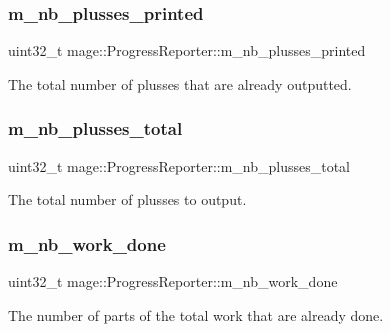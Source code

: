 \subsubsection{\texorpdfstring{m\+\_\+nb\+\_\+plusses\+\_\+printed}{m\_nb\_plusses\_printed}}
{\footnotesize\ttfamily uint32\+\_\+t mage\+::\+Progress\+Reporter\+::m\+\_\+nb\+\_\+plusses\+\_\+printed\hspace{0.3cm}{\ttfamily [protected]}}

The total number of plusses that are already outputted. \hypertarget{classmage_1_1_progress_reporter_aeae54fa7c542ccfbdaa44c0942c483fd}{}\label{classmage_1_1_progress_reporter_aeae54fa7c542ccfbdaa44c0942c483fd} 
\subsubsection{\texorpdfstring{m\+\_\+nb\+\_\+plusses\+\_\+total}{m\_nb\_plusses\_total}}
{\footnotesize\ttfamily uint32\+\_\+t mage\+::\+Progress\+Reporter\+::m\+\_\+nb\+\_\+plusses\+\_\+total\hspace{0.3cm}{\ttfamily [protected]}}

The total number of plusses to output. \hypertarget{classmage_1_1_progress_reporter_ad3cb941594f138c208fa522a355a985b}{}\label{classmage_1_1_progress_reporter_ad3cb941594f138c208fa522a355a985b} 
\subsubsection{\texorpdfstring{m\+\_\+nb\+\_\+work\+\_\+done}{m\_nb\_work\_done}}
{\footnotesize\ttfamily uint32\+\_\+t mage\+::\+Progress\+Reporter\+::m\+\_\+nb\+\_\+work\+\_\+done\hspace{0.3cm}{\ttfamily [protected]}}

The number of parts of the total work that are already done. \hypertarget{classmage_1_1_progress_reporter_a1b0c8d8f3cde82161b34897c5e95e09b}{}\label{classmage_1_1_progress_reporter_a1b0c8d8f3cde82161b34897c5e95e09b} 
